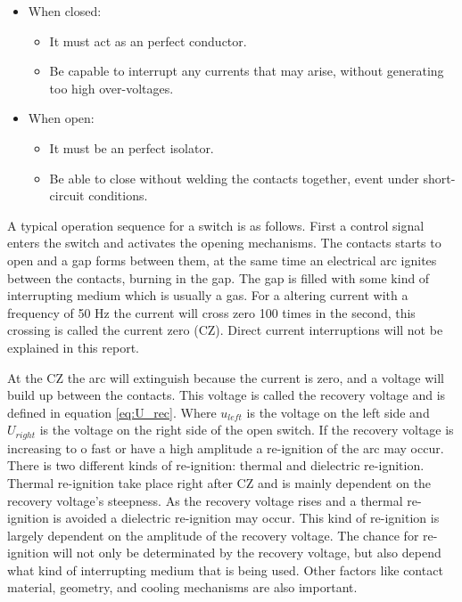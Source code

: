 \documentclass[10pt,a4paper]{article} %
\begin{document}
\begin{itemize}
\item When closed:
	\begin{itemize}
		\item It must act as an perfect conductor.
		\item Be capable to interrupt any currents that may arise, without generating too high over-voltages. 
	\end{itemize}
\item When open:
	\begin{itemize}
		\item It must be an perfect isolator.
		\item Be able to close without welding the contacts together, event under short-circuit conditions.
	\end{itemize}
\end{itemize}

A typical operation sequence for a switch is as follows. First a control signal enters the switch and activates the opening mechanisms. The contacts starts to open and a gap forms between them, at the same time an electrical arc ignites between the contacts, burning in the gap. The gap is filled with some kind of interrupting medium which is usually a gas. For a altering current with a frequency of 50 Hz the current will cross zero 100 times in the second, this crossing is called the current zero (CZ). Direct current interruptions will not be explained in this report. 

At the CZ the arc will extinguish because the current is zero, and a voltage will build up between the contacts. This voltage is called the recovery voltage and is defined in equation \eqref{eq:U_rec}. Where $u_{left}$ is the voltage on the left side and $U_{right}$ is the voltage on the right side of the open switch. If the recovery voltage is increasing to	o fast or have a high amplitude a re-ignition of the arc may occur. There is two different kinds of re-ignition: thermal and dielectric re-ignition. Thermal re-ignition take place right after CZ and is mainly dependent on the recovery voltage's steepness. As the recovery voltage rises and a thermal re-ignition is avoided a dielectric re-ignition may occur. This kind of re-ignition is largely dependent on the amplitude of the recovery voltage. The chance for re-ignition will not only be determinated by the recovery voltage, but also depend what kind of interrupting medium that is being used. Other factors like contact material, geometry, and cooling mechanisms are also important.
\end{document}
